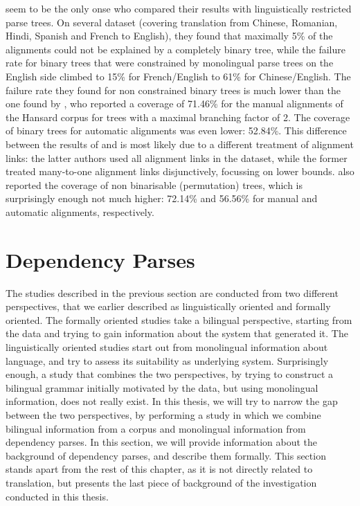 \cite{wellington2006empirical} seem to be the only onse who compared their results with linguistically restricted parse trees. On several dataset (covering translation from Chinese, Romanian, Hindi, Spanish and French to English), they found that maximally 5\% of the alignments could not be explained by a completely binary tree, while the failure rate for binary trees that were constrained by monolingual parse trees on the English side climbed to 15\% for French/English to 61\% for Chinese/English. The failure rate they found for non constrained binary trees is much lower than the one found by \cite{simaan2013hats}, who reported a coverage of 71.46\% for the manual alignments of the Hansard corpus for trees with a maximal branching factor of 2. The coverage of binary trees for automatic alignments was even lower: 52.84\%. This difference between the results of \cite{wellington2006empirical} and \cite{simaan2013hats} is most likely due to a different treatment of alignment links: the latter authors used all alignment links in the dataset, while the former treated many-to-one alignment links disjunctively, focussing on lower bounds. \cite{simaan2013hats} also reported the coverage of non binarisable (permutation) trees, which is surprisingly enough not much higher: 72.14\% and 56.56\% for manual and automatic alignments, respectively.


\section{Dependency Parses}
\label{sec:dep_parses}

The studies described in the previous section are conducted from two different perspectives, that we earlier described as linguistically oriented and formally oriented. The formally oriented studies take a bilingual perspective, starting from the data and trying to gain information about the system that generated it. The linguistically oriented studies start out from monolingual information about language, and try to assess its suitability as underlying system. Surprisingly enough, a study that combines the two perspectives, by trying to construct a bilingual grammar initially motivated by the data, but using monolingual information, does not really exist. In this thesis, we will try to narrow the gap between the two perspectives, by performing a study in which we combine bilingual information from a corpus and monolingual information from dependency parses. In this section, we will provide information about the background of dependency parses, and describe them formally. This section stands apart from the rest of this chapter, as it is not directly related to translation, but presents the last piece of background of the investigation conducted in this thesis.

